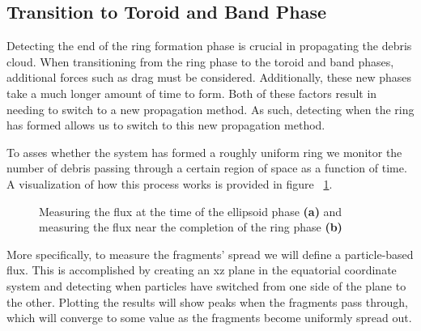 \documentclass[a4paper, 12pt]{article}
\begin{document}
\subsection{Transition to Toroid and Band Phase}

Detecting the end of the ring formation phase is crucial in propagating the debris cloud. When transitioning from the ring phase to the toroid and band phases, additional forces such as drag must be considered. Additionally, these new phases take a much longer amount of time to form. Both of these factors result in needing to switch to a new propagation method. As such, detecting when the ring has formed allows us to switch to this new propagation method.

To asses whether the system has formed a roughly uniform ring we monitor the number of debris passing through a certain region of space as a function of time. A visualization of how this process works is provided in figure ~\ref{flux_diagrams}.

\begin{figure}[h]
	\begin{adjustbox}{max width=1\linewidth,center}
		\centering     %
	\end{adjustbox}
	\caption{Measuring the flux at the time of the ellipsoid phase \textbf{(a)} and measuring the flux near the completion of the ring phase \textbf{(b)} }
	\label{flux_diagrams}
\end{figure}

More specifically, to measure the fragments' spread we will define a particle-based flux. This is accomplished by creating an xz plane in the equatorial coordinate system and detecting when particles have switched from one side of the plane to the other. Plotting the results will show peaks when the fragments pass through, which will converge to some value as the fragments become uniformly spread out.
\end{document}
